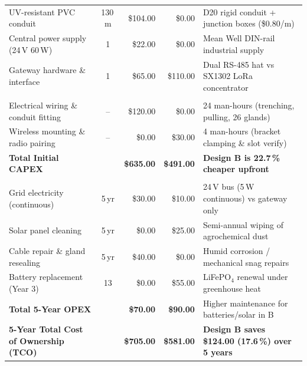\documentclass[11pt,a4paper]{report}
\begin{document}
\begin{table}[!htbp]
\begin{tabularx}{\textwidth}{>{\raggedright\arraybackslash}p{4.0cm} c r r Y}
UV-resistant PVC conduit & 130\,m & \$104.00 & \$0.00 & D20 rigid conduit + junction boxes (\$0.80/m)\\
Central power supply (24\,V 60\,W) & 1 & \$22.00 & \$0.00 & Mean Well DIN-rail industrial supply\\
Gateway hardware \& interface & 1 & \$65.00 & \$110.00 & Dual RS-485 hat vs SX1302 LoRa concentrator\\
\midrule
{}\\
Electrical wiring \& conduit fitting & -- & \$120.00 & \$0.00 & 24 man-hours (trenching, pulling, 26 glands)\\
Wireless mounting \& radio pairing & -- & \$0.00 & \$30.00 & 4 man-hours (bracket clamping \& slot verify)\\
\midrule
\textbf{Total Initial CAPEX} & & \textbf{\$635.00} & \textbf{\$491.00} & \textbf{Design B is 22.7\,\% cheaper upfront}\\
\midrule
{}\\
Grid electricity (continuous) & 5\,yr & \$30.00 & \$10.00 & 24\,V bus (5\,W continuous) vs gateway only\\
Solar panel cleaning & 5\,yr & \$0.00 & \$25.00 & Semi-annual wiping of agrochemical dust\\
Cable repair \& gland resealing & 5\,yr & \$40.00 & \$0.00 & Humid corrosion / mechanical snag repairs\\
Battery replacement (Year 3) & 13 & \$0.00 & \$55.00 & LiFePO$_4$ renewal under greenhouse heat\\
\midrule
\textbf{Total 5-Year OPEX} & & \textbf{\$70.00} & \textbf{\$90.00} & Higher maintenance for batteries/solar in B\\
\midrule
\textbf{5-Year Total Cost of Ownership (TCO)} & & \textbf{\$705.00} & \textbf{\$581.00} & \textbf{Design B saves \$124.00 (17.6\,\%) over 5 years}\\
\bottomrule
\end{tabularx}
\end{table}
\end{document}
